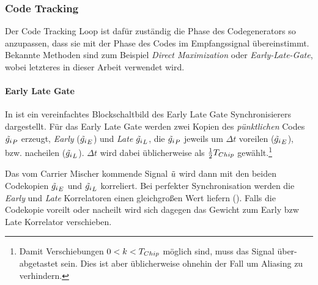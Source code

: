 \subsubsection{Code Tracking}
Der Code Tracking Loop ist dafür zuständig die Phase des Codegenerators so anzupassen, dass sie mit der Phase des Codes im Empfangssignal übereinstimmt. Bekannte Methoden sind zum Beispiel \emph{Direct Maximization} oder \emph{Early-Late-Gate}, wobei letzteres in dieser Arbeit verwendet wird.


\paragraph{Early Late Gate} \label{EarlyLateGate} In  ist ein vereinfachtes Blockschaltbild des Early Late Gate Synchronisierers dargestellt. Für das Early Late Gate werden zwei Kopien des \emph{pünktlichen} Codes $\tilde{g_i}_P$ erzeugt, \emph{Early} ($\tilde{g_i}_E$) und \emph{Late} $\tilde{g_i}_L$, die $\tilde{g_i}_P$ jeweils  um $\Delta t$ voreilen ($\tilde{g_i}_E$), bzw. nacheilen ($\tilde{g_i}_L$). $\Delta t$ wird dabei üblicherweise als $\frac{1}{2} {T}_{Chip}$ gewählt.\footnote{Damit Verschiebungen $0<k<{T}_{Chip}$ möglich sind, muss das Signal über-abgetastet sein. Dies ist aber üblicherweise ohnehin der Fall um Aliasing zu verhindern.}

Das vom Carrier Mischer kommende Signal $\tilde{u}$ wird dann mit den beiden Codekopien $\tilde{g_i}_E$ und $\tilde{g_i}_L$ korreliert. Bei perfekter Synchronisation werden die \emph{Early} und \emph{Late} Korrelatoren einen gleichgroßen Wert liefern (). Falls die Codekopie voreilt oder nacheilt wird sich dagegen das Gewicht zum Early bzw Late Korrelator verschieben.


\newcommand{\markerEarly}{\tikz{ \filldraw[fill=bmh02, draw=black, thin] (0,0) circle (.8ex); }~}
\newcommand{\markerLate}{\tikz{ \filldraw[fill=bmh04, draw=black, thin] (0,0) rectangle (1.4ex,1.4ex); }~}

